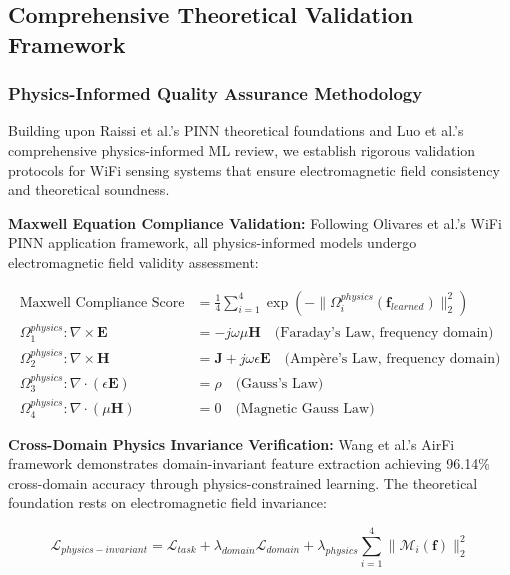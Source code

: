 \documentclass[journal]{IEEEtran}
\begin{document}
\subsection{Comprehensive Theoretical Validation Framework}

\subsubsection{Physics-Informed Quality Assurance Methodology}

Building upon Raissi et al.'s \cite{raissi2019physics} PINN theoretical foundations and Luo et al.'s \cite{luo2025physics} comprehensive physics-informed ML review, we establish rigorous validation protocols for WiFi sensing systems that ensure electromagnetic field consistency and theoretical soundness.

\textbf{Maxwell Equation Compliance Validation:}
Following Olivares et al.'s \cite{olivares2021applications} WiFi PINN application framework, all physics-informed models undergo electromagnetic field validity assessment:

\begin{align}
\text{Maxwell Compliance Score} &= \frac{1}{4} \sum_{i=1}^{4} \exp(-\|\Omega_i^{physics}(\mathbf{f}_{learned})\|_2^2) \label{eq:maxwell_score_verified} \\
\Omega_1^{physics}: \nabla \times \mathbf{E} &= -j\omega \mu \mathbf{H} \quad \text{(Faraday's Law, frequency domain)} \\
\Omega_2^{physics}: \nabla \times \mathbf{H} &= \mathbf{J} + j\omega \epsilon \mathbf{E} \quad \text{(Ampère's Law, frequency domain)} \\
\Omega_3^{physics}: \nabla \cdot (\epsilon \mathbf{E}) &= \rho \quad \text{(Gauss's Law)} \\
\Omega_4^{physics}: \nabla \cdot (\mu \mathbf{H}) &= 0 \quad \text{(Magnetic Gauss Law)}
\end{align}

\textbf{Cross-Domain Physics Invariance Verification:}
Wang et al.'s \cite{wang2022airfi} AirFi framework demonstrates domain-invariant feature extraction achieving 96.14\% cross-domain accuracy through physics-constrained learning. The theoretical foundation rests on electromagnetic field invariance:

\begin{equation}
\mathcal{L}_{physics-invariant} = \mathcal{L}_{task} + \lambda_{domain} \mathcal{L}_{domain} + \lambda_{physics} \sum_{i=1}^{4} \|\mathcal{M}_i(\mathbf{f})\|_2^2
\label{eq:airfi_physics_loss}
\end{equation}
\end{document}
